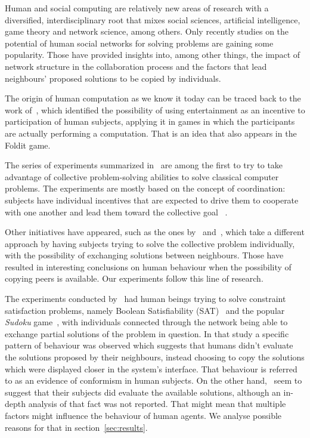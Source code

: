 \documentclass{article}
\begin{document}
Human and social computing are relatively new areas of research with a diversified, interdisciplinary root that mixes social sciences, artificial intelligence, game theory and network science, among others. %
Only recently studies on the potential of human social networks for solving problems are gaining some popularity. %
Those have provided insights into, among other things, the impact of network structure in the collaboration process and the factors that lead neighbours' proposed solutions to be copied by individuals.

The origin of human computation as we know it today can be traced back to the work of~\cite{vonahm:gwap}, which identified the possibility of using entertainment as an incentive to participation of human subjects, applying it in games in which the participants are actually performing a computation. That is an idea that also appears in the Foldit game. %

The series of experiments summarized in~\cite{kearns:experim} are among the first to try to take advantage of collective problem-solving abilities to solve classical computer problems. The experiments are mostly based on the concept of coordination: subjects have individual incentives that are expected to drive them to cooperate with one another and lead them toward the collective goal ~\cite{nowak:evolutioncooperation}.

Other initiatives have appeared, such as the ones by~\cite{farenzena:collabem} and~\cite{mason:collablearnet}, which take a different approach by having subjects trying to solve the collective problem individually, with the possibility of exchanging solutions between neighbours. Those have resulted in interesting conclusions on human behaviour when the possibility of copying peers is available. Our experiments follow this line of research.

The experiments conducted by~\cite{farenzena:collabem} had human beings trying to solve constraint satisfaction problems, namely Boolean Satisfiability (SAT)~\cite{cook:complexitytheoremproving} and the popular \emph{Sudoku} game~\cite{weber:satsudoku}, with individuals connected through the network being able to exchange partial solutions of the problem in question.
In that study a specific pattern of behaviour was observed which suggests that humans didn't evaluate the solutions proposed by their neighbours, instead choosing to copy the solutions which were displayed closer in the system's interface.
That behaviour is referred to as an evidence of conformism in human subjects. On the other hand,~\cite{mason:collablearnet} seem to suggest that their subjects did evaluate the available solutions, although %
an in-depth analysis of that fact was not reported. That might mean that multiple factors might influence the behaviour of human agents. We analyse possible reasons for that in section~\ref{sec:results}. %
\end{document}
